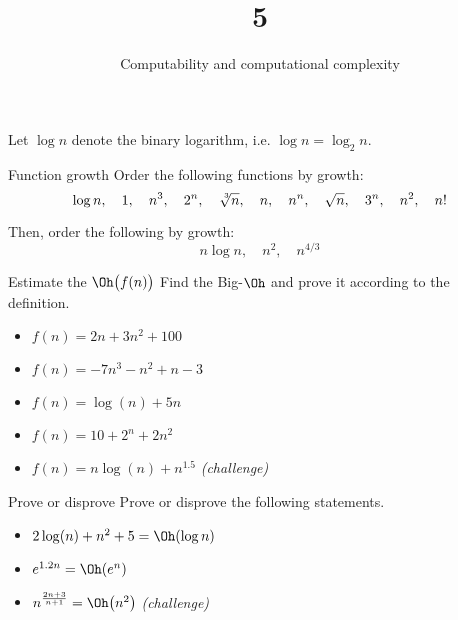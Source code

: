 \documentclass{practice}
\title{5}
\subtitle{Computability and computational complexity}
\date{\DTMdate{2024-10-09}}
\begin{document}
\maketitle

Let $\log{n}$ denote the binary logarithm, i.e. $\log{n} = \log_2{n}$.

\begin{task}{Function growth}
  Order the following functions by growth:
  \[
    \log n,\quad
    1,\quad
    n^3,\quad
    2^n,\quad
    \sqrt[\leftroot{-2}\uproot{2}3]{n},\quad
    n,\quad
    n^n,\quad
    \sqrt{n},\quad
    3^n,\quad
    n^2,\quad
    n!
  \]

  Then, order the following by growth:
  \[
    n \log n,\quad
    n^2,\quad
    n^{4/3}
  \]
\end{task}

\begin{task}{Estimate the $\Oh\bigl(f(n)\bigr)$}
  Find the Big-$\Oh$ and prove it according to the definition.
  \begin{itemize}
    \item $f(n) = 2n + 3n^2 + 100$
    \item $f(n) = -7n^3 - n^2 + n - 3$
    \item $f(n) = \log(n) + 5n$
    \item $f(n) = 10 + 2^n + 2n^2$
    \item $f(n) = n \log(n) + n^{1.5}$ \textit{(challenge)}
  \end{itemize}
\end{task}

\begin{task}{Prove or disprove}
  Prove or disprove the following statements.
  \begin{itemize}
    \item $2\log(n) + n^2 +5 = \Oh(\log{n})$
    \item $e^{1.2n} = \Oh(e^n)$
    \item $n^{\frac{2n + 3}{n+1}} = \Oh\bigl(n^2\bigr)$ \textit{(challenge)}
  \end{itemize}
\end{task}
\end{document}
